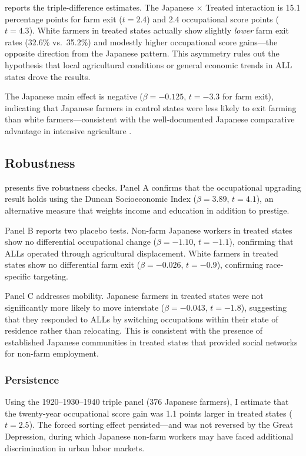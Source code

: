\documentclass[12pt]{article}
\begin{document}
 reports the triple-difference estimates. The Japanese $\times$ Treated interaction is 15.1 percentage points for farm exit ($t = 2.4$) and 2.4 occupational score points ($t = 4.3$). White farmers in treated states actually show slightly \textit{lower} farm exit rates (32.6\% vs.\ 35.2\%) and modestly higher occupational score gains---the opposite direction from the Japanese pattern. This asymmetry rules out the hypothesis that local agricultural conditions or general economic trends in ALL states drove the results.



The Japanese main effect is negative ($\beta = -0.125$, $t = -3.3$ for farm exit), indicating that Japanese farmers in control states were less likely to exit farming than white farmers---consistent with the well-documented Japanese comparative advantage in intensive agriculture \citep{iwata1962japanese}.

\subsection{Robustness}

 presents five robustness checks. Panel A confirms that the occupational upgrading result holds using the Duncan Socioeconomic Index ($\beta = 3.89$, $t = 4.1$), an alternative measure that weights income and education in addition to prestige.



Panel B reports two placebo tests. Non-farm Japanese workers in treated states show no differential occupational change ($\beta = -1.10$, $t = -1.1$), confirming that ALLs operated through agricultural displacement. White farmers in treated states show no differential farm exit ($\beta = -0.026$, $t = -0.9$), confirming race-specific targeting.

Panel C addresses mobility. Japanese farmers in treated states were not significantly more likely to move interstate ($\beta = -0.043$, $t = -1.8$), suggesting that they responded to ALLs by switching occupations within their state of residence rather than relocating. This is consistent with the presence of established Japanese communities in treated states that provided social networks for non-farm employment.

\subsubsection*{Persistence} Using the 1920--1930--1940 triple panel (376 Japanese farmers), I estimate that the twenty-year occupational score gain was 1.1 points larger in treated states ($t = 2.5$). The forced sorting effect persisted---and was not reversed by the Great Depression, during which Japanese non-farm workers may have faced additional discrimination in urban labor markets.
\end{document}

